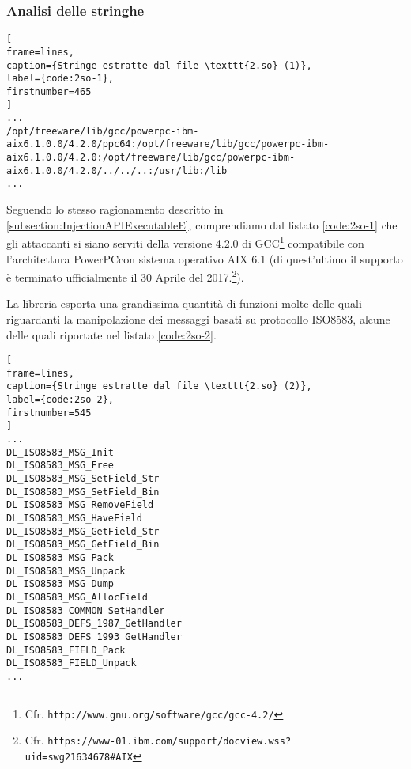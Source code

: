 \documentclass[10pt,a4paper, titlepage]{report}
\begin{document}
\subsubsection{Analisi delle stringhe}\label{strings2so}

\begin{lstlisting}[
frame=lines, 
caption={Stringe estratte dal file \texttt{2.so} (1)}, 
label={code:2so-1},
firstnumber=465
]
...
/opt/freeware/lib/gcc/powerpc-ibm-aix6.1.0.0/4.2.0/ppc64:/opt/freeware/lib/gcc/powerpc-ibm-aix6.1.0.0/4.2.0:/opt/freeware/lib/gcc/powerpc-ibm-aix6.1.0.0/4.2.0/../../..:/usr/lib:/lib
...
\end{lstlisting}

Seguendo lo stesso ragionamento descritto in \ref{subsection:InjectionAPIExecutableE}, comprendiamo dal listato \ref{code:2so-1} che gli attaccanti si siano serviti della versione 4.2.0 di GCC\footnote{Cfr. \texttt{http://www.gnu.org/software/gcc/gcc-4.2/}} compatibile con l'architettura PowerPC\texttrademark con sistema operativo AIX 6.1 (di quest'ultimo il supporto è terminato ufficialmente il 30 Aprile del 2017.\footnote{Cfr. \texttt{https://www-01.ibm.com/support/docview.wss?uid=swg21634678\#AIX}}).

La libreria esporta una grandissima quantità di funzioni molte delle quali riguardanti la manipolazione dei messaggi basati su protocollo ISO8583, alcune delle quali riportate nel listato \ref{code:2so-2}.

\begin{lstlisting}[
frame=lines, 
caption={Stringe estratte dal file \texttt{2.so} (2)}, 
label={code:2so-2},
firstnumber=545
]
...
DL_ISO8583_MSG_Init
DL_ISO8583_MSG_Free
DL_ISO8583_MSG_SetField_Str
DL_ISO8583_MSG_SetField_Bin
DL_ISO8583_MSG_RemoveField
DL_ISO8583_MSG_HaveField
DL_ISO8583_MSG_GetField_Str
DL_ISO8583_MSG_GetField_Bin
DL_ISO8583_MSG_Pack
DL_ISO8583_MSG_Unpack
DL_ISO8583_MSG_Dump
DL_ISO8583_MSG_AllocField
DL_ISO8583_COMMON_SetHandler
DL_ISO8583_DEFS_1987_GetHandler
DL_ISO8583_DEFS_1993_GetHandler
DL_ISO8583_FIELD_Pack
DL_ISO8583_FIELD_Unpack
...
\end{lstlisting}
\end{document}

